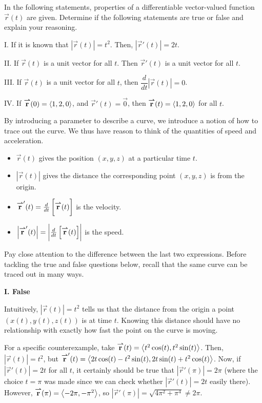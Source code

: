 \documentclass[noauthor]{ximera}
\begin{document}
\begin{problem}
In the following statements, properties of a differentiable vector-valued function $\vec{r}(t)$ are given.  Determine if the following statements are true or false and explain your reasoning.

I.  If it is known that $| \vec{r}(t) | = t^2$.  Then,  $| \vec{r}  ' (t) | = 2t$.

II. If $\vec{r}(t)$ is a unit vector for all $t$.  Then $\vec{r}  ' (t)$  is a unit vector for all $t$. 

III. If $\vec{r}(t)$ is a unit vector for all $t$, then $\dfrac{d}{dt} |\vec{r}(t) | =0$.

IV. If ${\overset{\boldsymbol{\rightharpoonup}}{\mathbf{r}}}(0)=\left\langle 1,2,0\right\rangle$, and $\vec{r}'(t)=\vec{0}$, then ${\overset{\boldsymbol{\rightharpoonup}}{\mathbf{r}}}(t) = \left\langle 1,2,0\right\rangle$ for all $t$.

 \begin{freeResponse}
By introducing a parameter to describe a curve, we introduce a notion of how to trace out the curve.  We thus have reason to think of the quantities of speed and acceleration.

\begin{itemize}
\item $\vec{r}(t)$ gives the position $(x,y,z)$ at a particular time $t$.
\item $|\vec{r}(t)|$ gives the distance the corresponding point $(x,y,z)$ is from the origin.
\item ${\overset{\boldsymbol{\rightharpoonup}}{\mathbf{r}}}'(t) = \frac{\mathop{}\!d}{\mathop{}\!d t} \left[\vphantom{\bigg|} {\overset{\boldsymbol{\rightharpoonup}}{\mathbf{r}}}(t) \right]$ is the velocity.
\item  $\left|{\overset{\boldsymbol{\rightharpoonup}}{\mathbf{r}}}'(t)\right| = \left|\vphantom{\bigg|}  \frac{\mathop{}\!d}{\mathop{}\!d t}\left[{\overset{\boldsymbol{\rightharpoonup}}{\mathbf{r}}}(t) \right]\right|$ is the speed.
\end{itemize}
Pay close attention to the difference between the last two expressions.  Before tackling the true and false questions below, recall that the same curve can be traced out in many ways.  

 \textbf{I. False}
 
\begin{explanation}
Intuitively, $| \vec{r}(t) | = t^2$ tells us that the distance from the origin a point $(x(t),y(t),z(t))$ is at time $t$.  Knowing this distance should have no relationship with exactly how fast the point on the curve is moving.
 
 For a specific counterexample, take ${\overset{\boldsymbol{\rightharpoonup}}{\mathbf{r}}}(t)=\left\langle t^2\cos(t),t^2\sin(t)\right\rangle$.  Then, $|\vec{r}(t)| = t^2$, but ${\overset{\boldsymbol{\rightharpoonup}}{\mathbf{r}}}'(t) = \left\langle 2t\cos(t)-t^2\sin(t), 2t\sin(t)+t^2\cos(t)\right\rangle$.  Now, if $|\vec{r}'(t)|=2t$ for all $t$, it certainly should be true that $|\vec{r}'(\pi)|=2\pi$ (where the choice $t=\pi$ was made since we can check whether $|\vec{r}'(t)| = 2t$ easily there).  However, ${\overset{\boldsymbol{\rightharpoonup}}{\mathbf{r}}}(\pi) = \left\langle -2\pi,-\pi^2\right\rangle$, so  $|\vec{r}'(\pi)| = \sqrt{4\pi^2+\pi^4} \neq 2 \pi$.
\end{explanation}
 

\end{freeResponse}
\end{problem}
\end{document}
